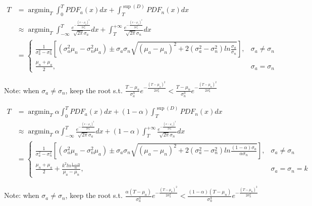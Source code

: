 \documentclass[10pt,conference,letterpaper]{article}
\begin{document}
			\begin{align}\label{equ:equal-weight}
				T &= \mathop{\arg\min}_{T} \int_{0}^{T}PDF_{a}(x)dx +
				\int_{T}^{\sup(D)}PDF_{n}(x)dx \nonumber\\
				& \approx \mathop{\arg\min}_{T}
				\int_{-\infty}^{T}
				\frac{e^{-\frac{(x - \mu_a)^2}{2\sigma_a^2}}}{\sqrt{2\pi} \sigma_a}dx
				+ \int_{T}^{+\infty}
				\frac{e^{-\frac{(x - \mu_n)^2}{2\sigma_n^2}}}{\sqrt{2\pi} \sigma_n}dx \nonumber\\
				& = \begin{cases}
				\displaystyle
				\frac{1}{\sigma_a^2 - \sigma_n^2}\left[(\sigma_a^2\mu_n - \sigma_n^2\mu_a) \pm \sigma_a\sigma_n\sqrt{(\mu_a - \mu_n)^2 + 2(\sigma_a^2 - \sigma_n^2)ln\frac{\sigma_a}{\sigma_n}}\right], & \sigma_a \ne \sigma_n\\
				\displaystyle \frac{\mu_n + \mu_a}{2}, & \sigma_a = \sigma_n
				\end{cases}
			\end{align}
			
			Note: when $\sigma_a \ne \sigma_n$, keep the root s.t. $\displaystyle \frac{T - \mu_a}{\sigma_a^3}e^{-\frac{(T - \mu_a)^2}{2\sigma_a^2}} < \frac{T - \mu_n}{\sigma_n^3}e^{-\frac{(T - \mu_n)^2}{2\sigma_n^2}}$
			
			\begin{align}\label{equ:linear-weight}
				T & = \mathop{\arg\min}_{T} \alpha\int_{0}^{T}PDF_{a}(x)dx +
				(1-\alpha)\int_{T}^{\sup(D)}PDF_{n}(x)dx\nonumber\\
				& \approx \mathop{\arg\min}_{T}
				\alpha\int_{-\infty}^{T}
				\frac{e^{-\frac{(x - \mu_a)^2}{2\sigma_a^2}}}{\sqrt{2\pi} \sigma_a}dx
				+ 
				(1-\alpha)\int_{T}^{+\infty}
				\frac{e^{-\frac{(x - \mu_n)^2}{2\sigma_n^2}}}{\sqrt{2\pi} \sigma_n}dx\nonumber\\
				& = \begin{cases}
				\displaystyle
				\frac{1}{\sigma_a^2 - \sigma_n^2}\left[(\sigma_a^2\mu_n - \sigma_n^2\mu_a) \pm \sigma_a\sigma_n\sqrt{(\mu_a - \mu_n)^2 + 2(\sigma_a^2 - \sigma_n^2)ln\frac{(1 - \alpha)\sigma_a}{\alpha\sigma_n}}\right], & \sigma_a \ne \sigma_n\\
				\displaystyle
				\frac{\mu_n + \mu_a}{2} + \frac{k^2ln\frac{1 - \alpha}{\alpha}}{\mu_a - \mu_n}, & \sigma_a = \sigma_n = k
				\end{cases}
			\end{align}
			
			Note: when $\sigma_a \ne \sigma_n$, keep the root s.t. $\displaystyle \frac{\alpha (T - \mu_a)}{\sigma_a^3}e^{-\frac{(T - \mu_a)^2}{2\sigma_a^2}} < \frac{(1 - \alpha) (T - \mu_n)}{\sigma_n^3}e^{-\frac{(T - \mu_n)^2}{2\sigma_n^2}}$
			
\end{document}
